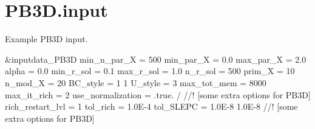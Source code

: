 \hypertarget{PB3D_8input-example}{}\section{P\+B3\+D.\+input}
Example P\+B3D input.


\begin{DoxyCodeInclude}
&inputdata\_PB3D
    min\_n\_par\_X             = 500
    min\_par\_X               = 0.0
    max\_par\_X               = 2.0
    alpha                   = 0.0
    min\_r\_sol               = 0.1
    max\_r\_sol               = 1.0
    n\_r\_sol                 = 500
    prim\_X                  = 10
    n\_mod\_X                 = 20
    BC\_style                = 1 1
    U\_style                 = 3
    max\_tot\_mem             = 8000
    max\_it\_rich             = 2
    use\_normalization       = .true.
/
//! [some extra options for PB3D]
    rich\_restart\_lvl        = 1
    tol\_rich                = 1.0E-4
    tol\_SLEPC               = 1.0E-8 1.0E-8
//! [some extra options for PB3D]
\end{DoxyCodeInclude}
 